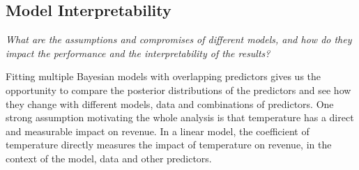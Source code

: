 \subsection{Model Interpretability}
\begin{center}
  \textit{What are the assumptions and compromises of different models, and how do they impact the performance and the interpretability of the results? }
\end{center}
Fitting multiple Bayesian models with overlapping predictors gives us the
opportunity to compare the posterior distributions of the predictors and see
how they change with different models, data and combinations of predictors. One
strong assumption motivating the whole analysis is that temperature has a
direct and measurable impact on revenue. In a linear model, the coefficient of
temperature directly measures the impact of temperature on revenue, in the
context of the model, data and other predictors. 

